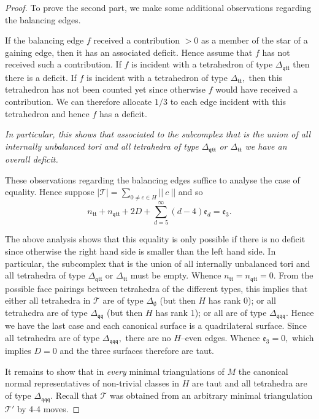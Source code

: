 \documentclass[a4paper]{gtart}
\def\tri{\mathcal{T}}
\def\manifold{M}
\def\Tee{\Delta_{\emptyset}}
\def\Ttt{\Delta_{\mathfrak{tt}}}
\def\Tqtt{\Delta_{\mathfrak{qtt}}}
\def\Tqq{\Delta_{\mathfrak{qq}}}
\def\Tqqq{\Delta_{\mathfrak{qqq}}}
\def\even{\mathfrak{e}}
\def\ntt{n_{\mathfrak{tt}}}
\def\nqtt{n_{\mathfrak{qtt}}}
\theoremstyle{plain}
\theoremstyle{definition}
\theoremstyle{remark}
\numberwithin{equation}{section}
\begin{document}
\begin{proof}
\medskip

To prove the second part, we make some additional observations regarding the balancing edges.

If the balancing edge $f$ received a contribution $>0$ as a member of the star of a gaining edge, then it has an associated deficit. Hence assume that $f$ has not received such a contribution. If $f$ is incident with a tetrahedron of type $\Tqtt$ then there is a deficit. If $f$ is incident with a tetrahedron of type $\Ttt,$ then this tetrahedron has not been counted yet since otherwise $f$ would have received a contribution. We can therefore allocate $1/3$ to each edge incident with this tetrahedron and hence $f$ has a deficit.

\emph{In particular, this shows that associated to the subcomplex that is the union of all internally unbalanced tori and all tetrahedra of type $\Tqtt$ or $\Ttt$ we have an overall deficit.}



\medskip

These observations regarding the balancing edges suffice to analyse the case of equality. Hence suppose \(|\tri| = \sum \limits_{0\neq c \in H} ||\ c\ ||\) and so
\begin{equation*}
  \ntt+\nqtt+2 D+\sum_{d=5}^{\infty} (d-4) \even_d = \even_3.
\end{equation*}

The above analysis shows that
this equality is only possible if there is no deficit since otherwise the right hand side is smaller than the left hand side. In particular, the subcomplex that is the union of all internally unbalanced tori and all tetrahedra of type $\Tqtt$ or $\Ttt$ must be empty. Whence $\ntt = \nqtt=0.$ From the possible face pairings between tetrahedra of the different types, this implies that either all tetrahedra in $\tri$ are of type $\Tee$ (but then $H$ has rank 0); or all tetrahedra are of type $\Tqq$ (but then $H$ has rank 1); or all are of type $\Tqqq.$ Hence we have the last case and each canonical surface is a quadrilateral surface.
Since all tetrahedra are of type $\Tqqq,$ there are no $H$--even edges. Whence $\even_3=0,$ which implies $D=0$ and the three surfaces therefore are taut. 

\medskip

It remains to show that in {\em every} minimal triangulations of $\manifold$ the canonical normal representatives of non-trivial classes in $H$ are taut and all tetrahedra are of type $\Tqqq$. Recall that $\tri$ was obtained from an arbitrary minimal triangulation $\tri'$ by 4-4 moves.


\end{proof}
\end{document}
